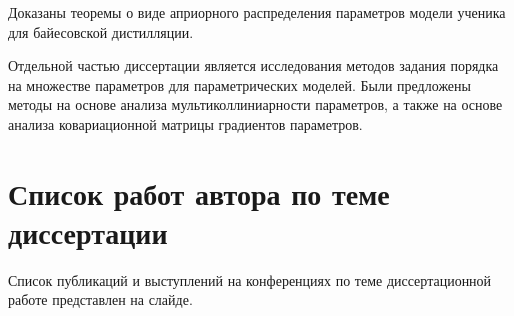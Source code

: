 \documentclass[10pt, twoside]{article}
\begin{document}
Доказаны теоремы о виде априорного распределения параметров модели ученика для байесовской дистилляции.

Отдельной частью диссертации является исследования методов задания порядка на множестве параметров для параметрических моделей. Были предложены методы на основе анализа мультиколлиниарности параметров, а также на основе анализа ковариационной матрицы градиентов параметров.

\section{Список работ автора по теме диссертации}
Список публикаций и выступлений на конференциях по теме диссертационной работе представлен на слайде.
\end{document}
